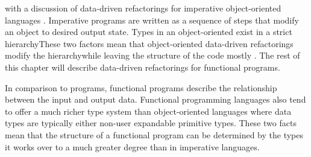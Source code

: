 \DIFaddend with a discussion of data-driven refactorings for imperative \DIFaddbegin {}\DIFaddend object-oriented languages \DIFaddbegin {}\DIFaddend . Imperative programs are written as a sequence of steps that modify an object to \DIFdelbegin {}\DIFdelend \DIFaddbegin {}\DIFaddend desired output state. Types in an object-oriented \DIFdelbegin {}\DIFdelend \DIFaddbegin {}\DIFaddend exist in a strict hierarchy\DIFdelbegin {}\DIFdelend \DIFaddbegin {}\texttt{}\DIFaddend These two factors mean that object-oriented data-driven refactorings modify the hierarchy\DIFaddbegin {}\DIFaddend while leaving the structure of the code mostly \DIFdelbegin {}\DIFdelend \DIFaddbegin {}\DIFaddend . The rest of this chapter will describe data-driven refactorings for functional programs.

In comparison to \DIFdelbegin {}\DIFdelend \DIFaddbegin {}\DIFaddend programs, functional programs \DIFdelbegin {}\DIFdelend describe the relationship between the input and output data. Functional programming languages also tend to offer a much richer type system than object-oriented languages where data types are typically either \DIFdelbegin {}\DIFdelend \DIFaddbegin {}\DIFaddend non-user expandable \DIFaddbegin {}\DIFaddend primitive types. These two facts mean that the structure of a functional program can be determined by the types it works over to a much greater degree than in imperative languages.

